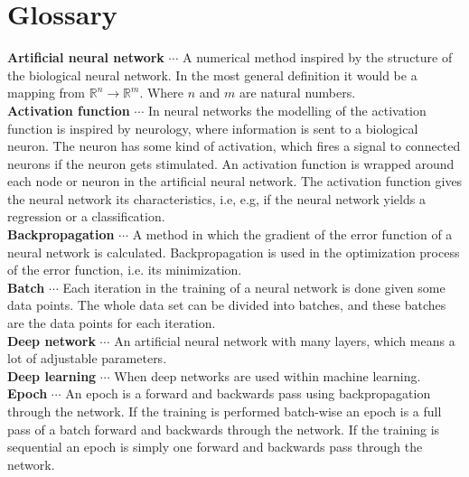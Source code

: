 \documentclass[11pt, letterpaper]{amsart}
\begin{document}
\newpage


\section*{Glossary}
\noindent
\textbf{Artificial neural network} $\cdots$ A numerical method inspired by the structure of the biological neural network. In the most general definition it would be a mapping from $\mathbb{R}^n \rightarrow \mathbb{R}^m$. Where $n$ and $m$ are natural numbers.
\\

\noindent
\textbf{Activation function} $\cdots$ In neural networks the modelling of the activation function is inspired by neurology, where information is sent to a biological neuron. The neuron has some kind of activation, which fires a signal to connected neurons if the neuron gets stimulated. An activation function is wrapped around each node or neuron in the artificial neural network. The activation function gives the neural network its characteristics, i.e, e.g, if the neural network yields a regression or a classification.
\\

\noindent
\textbf{Backpropagation} $\cdots$ A method in which the gradient of the error function of a neural network is calculated. Backpropagation is used in the optimization process of the error function, i.e. its minimization.
\\

\noindent
\textbf{Batch} $\cdots$ Each iteration in the training of a neural network is done given some data points. The whole data set can be divided into batches, and these batches are the data points for each iteration.
\\

\noindent
\textbf{Deep network} $\cdots$ An artificial neural network with many layers, which means a lot of adjustable parameters.
\\

\noindent
\textbf{Deep learning} $\cdots$ When deep networks are used within machine learning.
\\

\noindent
\textbf{Epoch} $\cdots$ An epoch is a forward and backwards pass using backpropagation through the network. If the training is performed batch-wise an epoch is a full pass of a batch forward and backwards through the network. If the training is sequential an epoch is simply one forward and backwards pass through the network. 
\\
\end{document}

